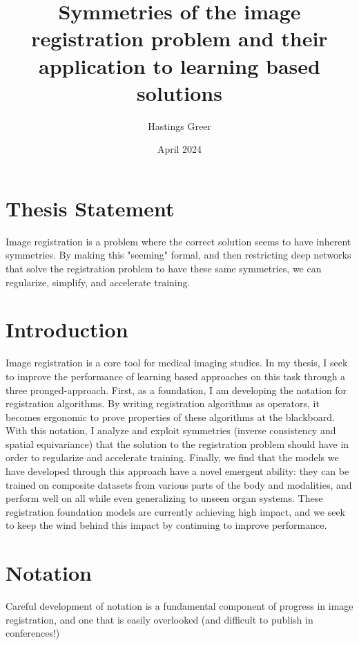 \documentclass{article}
\title{Symmetries of the image registration problem and their application to learning based solutions}
\author{Hastings Greer }
\date{April 2024}
\begin{document}
\maketitle

\section{Thesis Statement}
Image registration is a problem where the correct solution seems to have inherent symmetries. By making this "seeming" formal, and then restricting deep networks that solve the registration problem to have these same symmetries, we can regularize, simplify, and accelerate training. 

\section{Introduction}

Image registration is a core tool for medical imaging studies. In my thesis, I
seek to improve the performance of learning based approaches on this task
through a three pronged-approach. First, as a foundation, I am developing the
notation for registration algorithms. By writing registration algorithms as
operators, it becomes ergonomic to prove properties of these algorithms at the
blackboard.
With this notation, I analyze and exploit symmetries (inverse consistency and spatial
equivariance) that the solution to the registration problem should have in
order to regularize and accelerate training. Finally, we find that the models we have developed through this approach have a novel emergent ability: they can be trained on composite datasets from various parts of the body and modalities, and perform well on all while even generalizing to unseen organ systems. These registration foundation models are currently achieving high impact, and we seek to keep the wind behind this impact by continuing to improve performance.

\section{Notation}

Careful development of notation is a fundamental component of progress in image
registration, and one that is easily overlooked (and difficult to publish in
conferences!)
\end{document}

